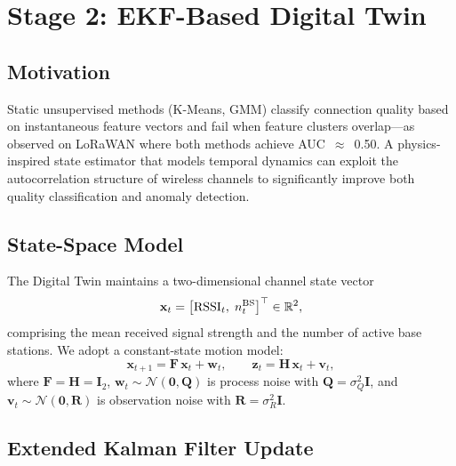 \documentclass[12pt,a4paper]{article}
\begin{document}
\section{Stage 2: EKF-Based Digital Twin}
\label{sec:dt}

\subsection{Motivation}

Static unsupervised methods (K-Means, GMM) classify connection quality
based on instantaneous feature vectors and fail when feature clusters
overlap—as observed on LoRaWAN where both methods achieve AUC~$\approx$~0.50.
A physics-inspired state estimator that models temporal dynamics
can exploit the autocorrelation structure of wireless channels to
significantly improve both quality classification and anomaly detection.

\subsection{State-Space Model}

The Digital Twin maintains a two-dimensional channel state vector
\begin{equation}
\mathbf{x}_t = \bigl[{\rm RSSI}_t,\; n^{\rm BS}_t\bigr]^\top \in \mathbb{R}^2,
\label{eq:state}
\end{equation}
comprising the mean received signal strength and the number of active
base stations. We adopt a constant-state motion model:
\begin{equation}
\mathbf{x}_{t+1} = \mathbf{F}\,\mathbf{x}_t + \mathbf{w}_t, \qquad
\mathbf{z}_t = \mathbf{H}\,\mathbf{x}_t + \mathbf{v}_t,
\label{eq:ssmodel}
\end{equation}
where $\mathbf{F} = \mathbf{H} = \mathbf{I}_2$,
$\mathbf{w}_t\sim\mathcal{N}(\mathbf{0},\mathbf{Q})$ is process noise
with $\mathbf{Q}=\sigma_Q^2\mathbf{I}$, and
$\mathbf{v}_t\sim\mathcal{N}(\mathbf{0},\mathbf{R})$ is observation noise
with $\mathbf{R}=\sigma_R^2\mathbf{I}$.

\subsection{Extended Kalman Filter Update}
\end{document}
